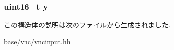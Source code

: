 \label{structVncInput_1_1FrameBufferUpdateReq_a4dde988b1b2adba65ae3efa69f65d960}
\hypertarget{structVncInput_1_1FrameBufferUpdateReq_ab0580f504a7428539be299fa71565f30}{
\subsubsection[{y}]{\setlength{\rightskip}{0pt plus 5cm}uint16\_\-t {\bf y}}}
\label{structVncInput_1_1FrameBufferUpdateReq_ab0580f504a7428539be299fa71565f30}


この構造体の説明は次のファイルから生成されました:\begin{DoxyCompactItemize}
\item 
base/vnc/\hyperlink{vncinput_8hh}{vncinput.hh}\end{DoxyCompactItemize}

